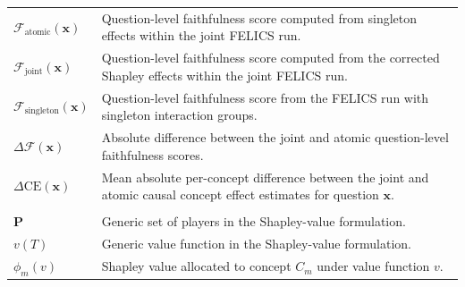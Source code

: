 \begin{longtable}{@{}>{\raggedright\arraybackslash}p{} p{}@{}}
	$\mathcal{F}_{\mathrm{atomic}}(\mathbf{x})$        & Question-level faithfulness score computed from singleton effects within the joint FELICS run.                                                                                                                     \\
	$\mathcal{F}_{\mathrm{joint}}(\mathbf{x})$         & Question-level faithfulness score computed from the corrected Shapley effects within the joint FELICS run.                                                                                                         \\
	$\mathcal{F}_{\mathrm{singleton}}(\mathbf{x})$     & Question-level faithfulness score from the FELICS run with singleton interaction groups.                                                                                                                           \\
	$\Delta\mathcal{F}(\mathbf{x})$                    & Absolute difference between the joint and atomic question-level faithfulness scores.                                                                                                                               \\
	$\Delta\mathrm{CE}(\mathbf{x})$                    & Mean absolute per-concept difference between the joint and atomic causal concept effect estimates for question $\mathbf{x}$.                                                                                       \\
	\hline
	\multicolumn{2}{@{}l}{\textbf{Shapley-Value Notation}}                                                                                                                                                                                                                  \\
	\hline
	$\mathbf{P}$                                       & Generic set of players in the Shapley-value formulation.                                                                                                                                                           \\
	$v(T)$                                             & Generic value function in the Shapley-value formulation.                                                                                                                                                           \\
	$\phi_m(v)$                                        & Shapley value allocated to concept $C_m$ under value function $v$.                                                                                                                                                 \\

\end{longtable}
